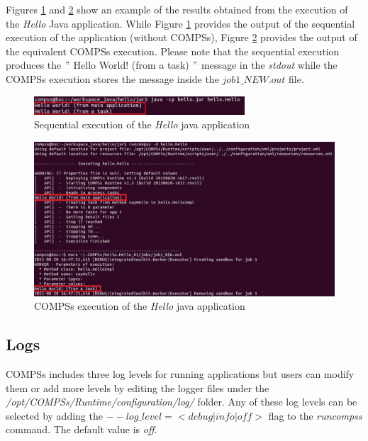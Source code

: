 Figures \ref{fig:hello_seq} and \ref{fig:hello_compss} show an example of the results obtained from the execution of the \textit{Hello} Java 
 application. While Figure \ref{fig:hello_seq} provides the output of the sequential execution of the application (without COMPSs), Figure \ref{fig:hello_compss}
provides the output of the equivalent COMPSs execution. Please note that the sequential execution produces the $"$ Hello World! (from a task) $"$ message
in the \textit{stdout} while the COMPSs execution stores the message inside the \textit{$job1\_NEW.out$} file.
\begin{figure}[h!]
  \centering
    \includegraphics[width=0.7\textwidth]{./Sections/3_Results_and_Logs/Figures/hello_seq_stdout.jpeg}
    \caption{Sequential execution of the \textit{Hello} java application}
    \label{fig:hello_seq}
\end{figure}

\begin{figure}[h!]
  \centering
    \includegraphics[width=\textwidth]{./Sections/3_Results_and_Logs/Figures/hello_compss_stdout_and_job.jpeg}
    \caption{COMPSs execution of the \textit{Hello} java application}
    \label{fig:hello_compss}
\end{figure}
\newpage

\subsection{Logs}
COMPSs includes three log levels for running applications but users can modify them or add more levels by editing the
logger files under the \textit{/opt/COMPSs/Runtime/configuration/log/} folder. Any of these log levels can be selected by 
adding the \textit{$--log\_level=<debug | info | off >$} flag to the \textit{runcompss} command. The default value is \textit{off}.

